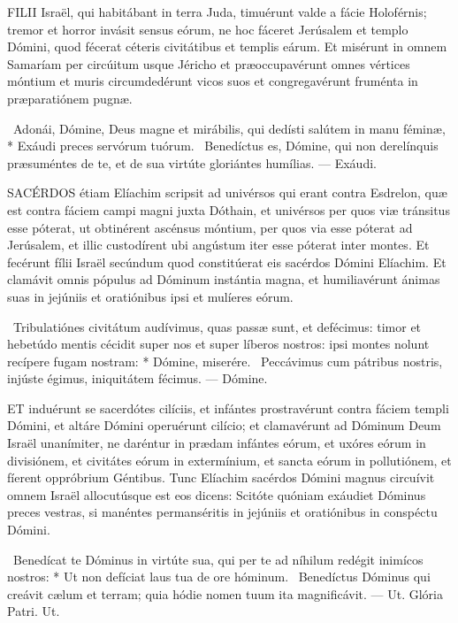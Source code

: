 \lettrine[lines=2]{F}{ILII} Israël, qui habitábant in terra Juda, timuérunt valde a fácie Holoférnis; tremor et horror invásit sensus eórum, ne hoc fáceret Jerúsalem et templo Dómini, quod fécerat céteris civitátibus et templis eárum. Et misérunt in omnem Samaríam per circúitum usque Jéricho et præoccupavérunt omnes vértices móntium et muris circumdedérunt vicos suos et congregavérunt fruménta in præparatiónem pugnæ.

\R\ Adonái, Dómine, Deus magne et mirábilis, qui dedísti salútem in manu féminæ, * Exáudi preces servórum tuórum. \V\ Benedíctus es, Dómine, qui non derelínquis præsuméntes de te, et de sua virtúte gloriántes humílias. — Exáudi.


\lettrine[lines=2]{S}{ACÉRDOS} étiam Elíachim scripsit ad univérsos qui erant contra Esdrelon, quæ est contra fáciem campi magni juxta Dóthain, et univérsos per quos viæ tránsitus esse póterat, ut obtinérent ascénsus móntium, per quos via esse póterat ad Jerúsalem, et illic custodírent ubi angústum iter esse póterat inter montes. Et fecérunt fílii Israël secúndum quod constitúerat eis sacérdos Dómini Elíachim. Et clamávit omnis pópulus ad Dóminum instántia magna, et humiliavérunt ánimas suas in jejúniis et oratiónibus ipsi et mulíeres eórum.

\R\ Tribulatiónes civitátum audívimus, quas passæ sunt, et defécimus: timor et hebetúdo mentis cécidit super nos et super líberos nostros: ipsi montes nolunt recípere fugam nostram: * Dómine, miserére. \V\ Peccávimus cum pátribus nostris, injúste égimus, iniquitátem fécimus. — Dómine.



\lettrine[lines=2]{E}{T} induérunt se sacerdótes cilíciis, et infántes prostravérunt contra fáciem templi Dómini, et altáre Dómini operuérunt cilício; et clamavérunt ad Dóminum Deum Israël unanímiter, ne daréntur in prædam infántes eórum, et uxóres eórum in divisiónem, et civitátes eórum in extermínium, et sancta eórum in pollutiónem, et fíerent oppróbrium Géntibus. Tunc Elíachim sacérdos Dómini magnus circuívit omnem Israël allocutúsque est eos dicens: Scitóte quóniam exáudiet Dóminus preces vestras, si manéntes permanséritis in jejúniis et oratiónibus in conspéctu Dómini.

\R\ Benedícat te Dóminus in virtúte sua, qui per te ad níhilum redégit inimícos nostros: * Ut non defíciat laus tua de ore hóminum. \V\ Benedíctus Dóminus qui creávit cælum et terram; quia hódie nomen tuum ita magnificávit. — Ut. Glória Patri. Ut.

